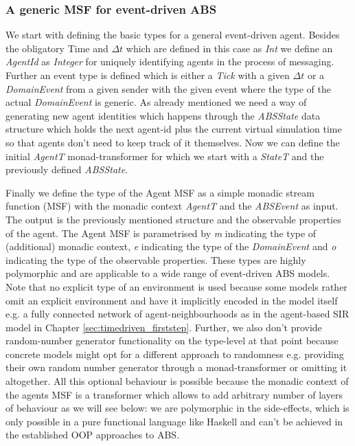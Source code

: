 \subsubsection{A generic MSF for event-driven ABS}
We start with defining the basic types for a general event-driven agent. Besides the obligatory Time and $\Delta t$ which are defined in this case as \textit{Int} we define an \textit{AgentId} as \textit{Integer} for uniquely identifying agents in the process of messaging. Further an event type is defined which is either a \textit{Tick} with a given $\Delta t$ or a \textit{DomainEvent} from a given sender with the given event where the type of the actual \textit{DomainEvent} is generic. As already mentioned we need a way of generating new agent identities which happens through the \textit{ABSState} data structure which holds the next agent-id plus the current virtual simulation time so that agents don't need to keep track of it themselves. Now we can define the initial \textit{AgentT} monad-transformer for which we start with a \textit{StateT} and the previously defined \textit{ABSState}. 

Finally we define the type of the Agent MSF as a simple monadic stream function (MSF) with the monadic context \textit{AgentT} and the \textit{ABSEvent} as input. The output is the previously mentioned structure and the observable properties of the agent. The Agent MSF is parametrised by \textit{m} indicating the type of (additional) monadic context, \textit{e} indicating the type of the \textit{DomainEvent} and \textit{o} indicating the type of the observable properties. These types are highly polymorphic and are applicable to a wide range of event-driven ABS models. Note that no explicit type of an environment is used because some models rather omit an explicit environment and have it implicitly encoded in the model itself e.g. a fully connected network of agent-neighbourhoods as in the agent-based SIR model in Chapter \ref{sec:timedriven_firststep}. Further, we also don't provide random-number generator functionality on the type-level at that point because concrete models might opt for a different approach to randomness e.g. providing their own random number generator through a monad-transformer or omitting it altogether. All this optional behaviour is possible because the monadic context of the agents MSF is a transformer which allows to add arbitrary number of layers of behaviour as we will see below: we are polymorphic in the side-effects, which is only possible in a pure functional language like Haskell and can't be achieved in the established OOP approaches to ABS.

